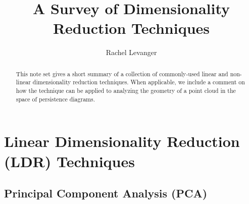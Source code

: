 \documentclass{gtpart}
\title{A Survey of Dimensionality Reduction Techniques}
\author{Rachel Levanger}
\theoremstyle{definition}
\begin{document}
\begin{abstract}    %

This note set gives a short summary of a collection of commonly-used linear and non-linear dimensionality reduction techniques. When applicable, we include a comment on how the technique can be applied to analyzing the geometry of a point cloud in the space of persistence diagrams.

\end{abstract}

\maketitle

\tableofcontents


\pagebreak 

\section{Linear Dimensionality Reduction (LDR) Techniques}

\subsection{Principal Component Analysis (PCA)} 
\end{document}
